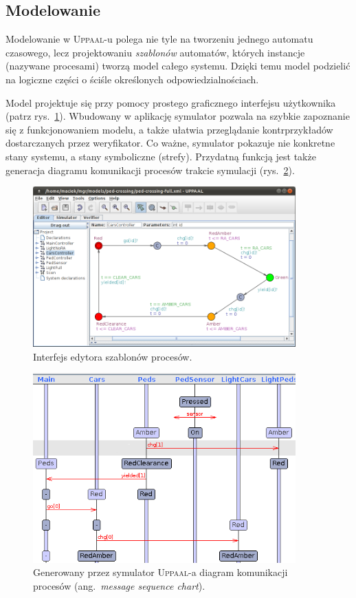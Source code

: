 \documentclass{pracamgr}
\newcommand{\ang}[1]{(ang.~\emph{#1})}
\newcommand{\upp}{\textsc{Uppaal}}
\theoremstyle{plain}
\begin{document}
\subsection{Modelowanie}
Modelowanie w \upp-u polega nie tyle na tworzeniu jednego automatu
czasowego, lecz projektowaniu \emph{szablonów} automatów, których
instancje (nazywane procesami) tworzą model całego systemu. Dzięki
temu model podzielić na logiczne części o ściśle określonych
odpowiedzialnościach.

Model projektuje się przy pomocy prostego graficznego interfejsu
użytkownika (patrz rys.~\ref{img:uppaal-gui}). Wbudowany w aplikację
symulator pozwala na szybkie zapoznanie się z funkcjonowaniem modelu,
a także ułatwia przeglądanie kontrprzykładów dostarczanych przez
weryfikator. Co ważne, symulator pokazuje nie konkretne stany systemu,
a stany symboliczne (strefy). Przydatną funkcją jest także generacja
diagramu komunikacji procesów trakcie symulacji
(rys.~\ref{img:uppaal-msc}).
\begin{figure}[ht]
  \centering
  \includegraphics[width=0.9\textwidth]{img/uppaal-editor.png}
  \caption{Interfejs edytora szablonów procesów.}
  \label{img:uppaal-gui}
\end{figure}

\begin{figure}[ht]
  \centering
  \includegraphics[width=0.9\textwidth]{img/uppaal-msc.png}
  \caption{Generowany przez symulator \upp-a diagram komunikacji
    procesów \ang{message sequence chart}.}
  \label{img:uppaal-msc}
\end{figure}
\end{document}
